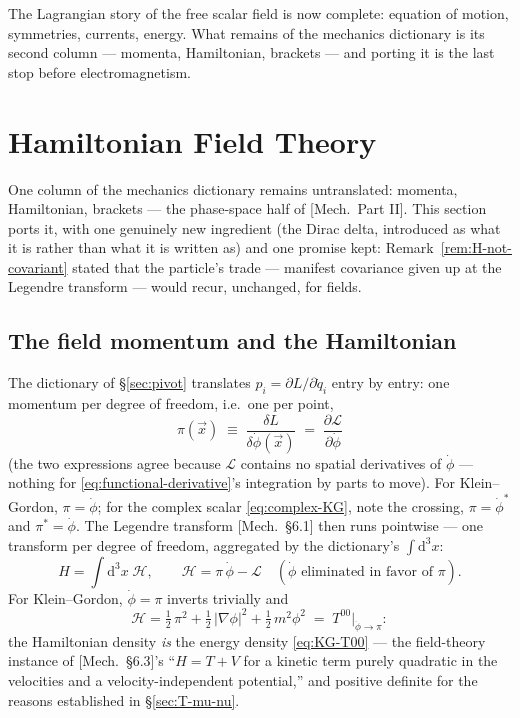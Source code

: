 \documentclass[11pt]{article}
\theoremstyle{plain}
\theoremstyle{definition}
\theoremstyle{remark}
\newcommand{\dd}{\mathrm{d}}
\newcommand{\pd}[2]{\frac{\partial #1}{\partial #2}}
\newcommand{\vx}{\vec{x}}
\begin{document}
\noindent
The Lagrangian story of the free scalar field is now complete:
equation of motion, symmetries, currents, energy. What remains of the
mechanics dictionary is its second column --- momenta, Hamiltonian,
brackets --- and porting it is the last stop before electromagnetism.

\section{Hamiltonian Field Theory}
\label{sec:hamiltonian-fields}

One column of the mechanics dictionary remains untranslated: momenta,
Hamiltonian, brackets --- the phase-space half of [Mech.\ Part II].
This section ports it, with one genuinely new ingredient (the Dirac
delta, introduced as what it is rather than what it is written as)
and one promise kept: Remark~\ref{rem:H-not-covariant}
stated that the particle's trade --- manifest covariance given up
at the Legendre transform --- would recur, unchanged, for fields.

\subsection{The field momentum and the Hamiltonian}
\label{sec:field-momentum}

The dictionary of \S\ref{sec:pivot} translates
$p_i = \partial L/\partial\dot q_i$ entry by entry: one momentum per
degree of freedom, i.e.\ one per point,
\begin{equation}
  \boxed{\;
  \pi(\vx)
  \;\equiv\;
  \frac{\delta L}{\delta\dot\phi(\vx)}
  \;=\;
  \pd{\mathcal L}{\dot\phi}
  \;}
  \label{eq:field-momentum}
\end{equation}
(the two expressions agree because $\mathcal L$ contains no spatial
derivatives of $\dot\phi$ --- nothing for
\eqref{eq:functional-derivative}'s integration by parts to move). For
Klein--Gordon, $\pi = \dot\phi$; for the complex scalar
\eqref{eq:complex-KG}, note the crossing, $\pi = \dot\phi^*$ and
$\pi^* = \dot\phi$. The Legendre transform [Mech.\ \S6.1] then runs
pointwise --- one transform per degree of freedom, aggregated by the
dictionary's $\int\dd^3x$:
\begin{equation}
  \boxed{\;
  H = \int \dd^3x\;\mathcal H,
  \qquad
  \mathcal H
  = \pi\,\dot\phi - \mathcal L
  \quad (\dot\phi \text{ eliminated in favor of } \pi).
  \;}
\end{equation}
For Klein--Gordon, $\dot\phi = \pi$ inverts trivially and
\begin{equation}
  \mathcal H
  = \tfrac12\,\pi^2
  + \tfrac12\,|\nabla\phi|^2
  + \tfrac12\, m^2\phi^2
  \;=\; T^{00}\big|_{\dot\phi\to\pi} :
  \label{eq:KG-hamiltonian-density}
\end{equation}
the Hamiltonian density \emph{is} the energy density
\eqref{eq:KG-T00} --- the field-theory instance of [Mech.\ \S6.3]'s
``$H = T + V$ for a kinetic term purely quadratic in the velocities
and a velocity-independent potential,''
and positive definite for the reasons established in \S\ref{sec:T-mu-nu}.
\end{document}
